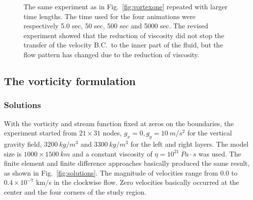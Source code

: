 \documentclass[11pt]{article}
\numberwithin{figure}{section}  %
\numberwithin{equation}{section}  %
\begin{document}
\begin{multicols}{2}
\begin{figure}[!htb]
{	}
	\caption{The same experiment as in Fig.\ \ref{fig:vortexone} repeated with larger time lengths. The time used for the four animations were respectively 5.0 sec, 50 sec, 500 sec and 5000 sec. The revised experiment showed that the reduction of viscosity did not stop the transfer of the velocity B.C.\ to the inner part of the fluid, but the flow pattern has changed due to the reduction of viscosity.}
	\label{fig:vortextwo}
\end{figure}

\subsection{The vorticity formulation}

\subsubsection{Solutions}

With the vorticity and stream function fixed at zeros on the boundaries, the experiment started from $21\times31$ nodes, $g_x=0,g_y=10\ m/s^2$ for the vertical gravity field, $3200\ kg/m^3$ and $3300\ kg/m^3$ for the left and right layers. The model size is $1000\times1500\ km$ and a constant viscosity of $\eta=10^{21}\ Pa\cdot{s}$ was used. The finite element and finite difference approaches basically produced the same result, as shown in Fig.\ \ref{fig:solutions}. The magnitude of velocities range from $0.0$ to $0.4\times10^{-7}$ km/s in the clockwise flow. Zero velocities basically occurred at the center and the four corners of the study region.


\end{multicols}
\end{document}
